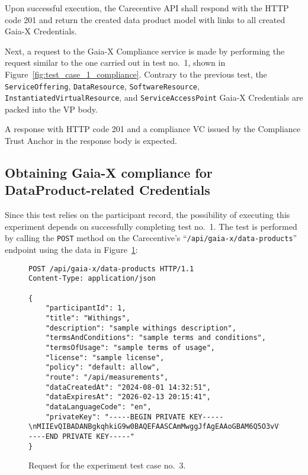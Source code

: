 Upon successful execution, the Carecentive API shall respond with the HTTP code 201 and return the created data product model with links to all created Gaia-X Credentials.

Next, a request to the Gaia-X Compliance service is made by performing the request similar to the one carried out in test no.~1, shown in Figure~\ref{fig:test_case_1_compliance}.
Contrary to the previous test, the \texttt{ServiceOffering}, \texttt{DataResource}, \texttt{SoftwareResource}, \texttt{InstantiatedVirtualResource}, and \texttt{ServiceAccessPoint} Gaia-X Credentials are packed into the VP body.

A response with HTTP code 201 and a compliance VC issued by the Compliance Trust Anchor in the response body is expected.

\subsection[Data Product Compliance]{Obtaining Gaia-X compliance for DataProduct-related Credentials}\label{subsec:data-product-compliance}

Since this test relies on the participant record, the possibility of executing this experiment depends on successfully completing test no.~1.
The test is performed by calling the \texttt{POST} method on the Carecentive's ``\texttt{/api\-/gaia-x\-/data-products}'' endpoint using the data in Figure~\ref{fig:test_case_3}:

\begin{figure}[h]
    \centering
    \begin{verbatim}
POST /api/gaia-x/data-products HTTP/1.1
Content-Type: application/json

{
    "participantId": 1,
	"title": "Withings",
	"description": "sample withings description",
	"termsAndConditions": "sample terms and conditions",
	"termsOfUsage": "sample terms of usage",
	"license": "sample license",
	"policy": "default: allow",
	"route": "/api/measurements",
	"dataCreatedAt": "2024-08-01 14:32:51",
	"dataExpiresAt": "2026-02-13 20:15:41",
	"dataLanguageCode": "en",
	"privateKey": "-----BEGIN PRIVATE KEY-----\nMIIEvQIBADANBgkqhkiG9w0BAQEFAASCAmMwggJfAgEAAoGBAM6Q5O3vVfnxk6P7\n...\nYWw+HiFJh9XQpRUtv9PV8L8AqFFfMdsOpT6pgC+aA/WB\n-----END PRIVATE KEY-----"
}
    \end{verbatim}
    \caption{Request for the experiment test case no.~3.}\label{fig:test_case_3}
\end{figure}

